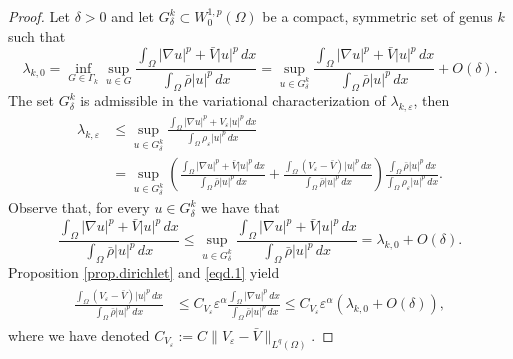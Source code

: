\documentclass[12pt]{amsart}
\theoremstyle{definition}
\theoremstyle{remark}
\numberwithin{equation}{section}
\begin{document}
\begin{proof}
Let $\delta>0$ and let $G_\delta^k\subset W^{1,p}_0(\Omega)$ be a compact, symmetric set of genus $k$ such that 
$$
\lambda_{k,0} = \inf_{G\in \Gamma_k} \sup_{u\in G} \frac{\int_\Omega |\nabla u|^p + \bar V |u|^p \,dx}{\int_\Omega \bar \rho |u|^p\,dx} 
= \sup_{u\in G_\delta^k} \frac{\int_\Omega |\nabla u|^p + \bar V |u|^p\,dx}{\int_\Omega \bar \rho |u|^p\,dx} + O(\delta).
$$
The set $G_\delta^k$ is admissible in the variational characterization of $\lambda_{k,\varepsilon}$, then
\begin{align*}
\lambda_{k,\varepsilon} &\leq \sup_{u\in G_\delta^k} \frac{\int_\Omega |\nabla u|^p  +   V_\varepsilon |u|^p\,dx}{\int_\Omega  \rho_\varepsilon |u|^p\,dx}\\ 
&=  \sup_{u\in G_\delta^k} \left( \frac{\int_\Omega |\nabla u|^p + \bar V |u|^p \,dx}{\int_\Omega  \bar \rho |u|^p\,dx}  +  \frac{\int_\Omega (V_\varepsilon - \bar V) |u|^p \,dx}{\int_\Omega  \bar \rho |u|^p\,dx} \right)
\frac{\int_\Omega  \bar \rho |u|^p\,dx}{\int_\Omega  \rho_\varepsilon |u|^p\,dx} . 
\end{align*}
Observe that, for every $u\in G_\delta^k$ we have that
\begin{equation} \label{eqd.1}
\frac{\int_\Omega |\nabla u|^p + \bar V |u|^p \,dx}{\int_\Omega  \bar \rho |u|^p  \,dx} \leq  \sup_{u\in G_\delta^k} \frac{\int_\Omega |\nabla u|^p + \bar V |u|^p\,dx}{\int_\Omega  \bar \rho |u|^p\,dx} = \lambda_{k,0}+O(\delta). 
\end{equation}
Proposition \ref{prop.dirichlet} and \eqref{eqd.1} yield
\begin{align} \label{eqd.2}
\begin{split}
\frac{\int_\Omega (V_\varepsilon - \bar V) |u|^p \,dx}{\int_\Omega  \bar \rho |u|^p\,dx} &\leq  C_{V_\varepsilon}
 \varepsilon^\alpha    \frac{\int_\Omega  |\nabla u|^p \,dx}{\int_\Omega  \bar \rho |u|^p\,dx}\leq
 C_{V_\varepsilon} \varepsilon^\alpha   (\lambda_{k,0}+O(\delta)),
\end{split}
\end{align}
where we have denoted $C_{V_\varepsilon}:=C\|V_\varepsilon - \bar V\|_{L^q(\Omega)}$.



\end{proof}
\end{document}
